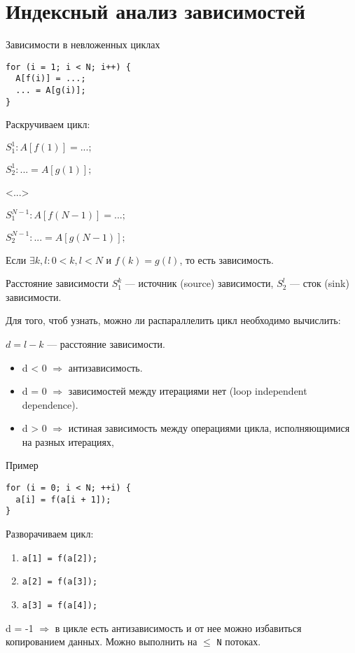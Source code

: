 \section{Индексный анализ зависимостей}

\begin{frame}[fragile]{Зависимости в невложенных циклах}
\begin{lstlisting}
for (i = 1; i < N; i++) {
  A[f(i)] = ...;
  ... = A[g(i)];
}
\end{lstlisting}

\pause

Раскручиваем цикл:

\bigskip

$S_1^1: A[f(1)] = ...;$

$S_2^1: ... = A[g(1)];$

<...>

$S_1^{N - 1}: A[f(N - 1)] = ...;$

$S_2^{N - 1}: ... = A[g(N - 1)];$

\pause\bigskip

Если $\exists k, l: 0 < k, l < N$ и $f(k) = g(l)$, то есть зависимость.
\end{frame}

\begin{frame}{Расстояние зависимости}
$S_1^k$ --- источник (\abbr source) зависимости, $S_2^l$ --- сток (\abbr sink)
зависимости.

\pause

Для того, чтоб узнать, можно ли распараллелить цикл необходимо вычислить:

$d = l - k$ --- расстояние зависимости.

\pause

\begin{itemize}
    \item d < 0 $\Rightarrow$ антизависимость.
    \item d = 0 $\Rightarrow$ зависимостей между итерациями нет (\abbr loop
    independent dependence).
    \item d > 0 $\Rightarrow$ истиная зависимость между операциями цикла,
    исполняющимися на разных итерациях,
\end{itemize}
\end{frame}

\begin{frame}[fragile]{Пример}
\begin{lstlisting}
for (i = 0; i < N; ++i) {
  a[i] = f(a[i + 1]);
}
\end{lstlisting}

Разворачиваем цикл:

\begin{enumerate}
  \item \texttt{a[1] = f(a[2]);}
  \item \texttt{a[2] = f(a[3]);}
  \item \texttt{a[3] = f(a[4]);}
\end{enumerate}

d = -1 $\Rightarrow$ в цикле есть антизависимость и от нее можно избавиться
копированием данных. Можно выполнить на $\leq$ \texttt{N} потоках.
\end{frame}

